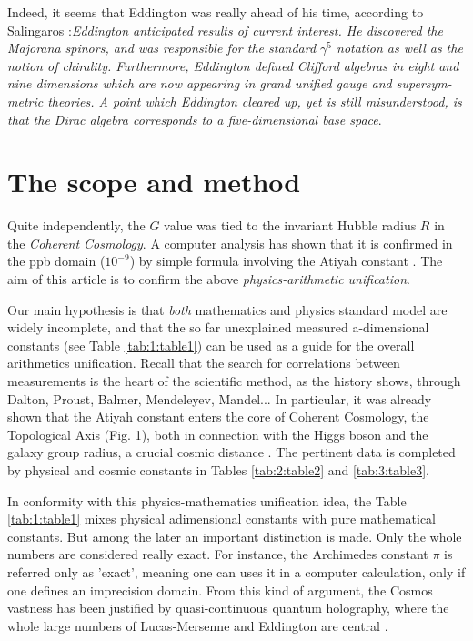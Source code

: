 \documentclass[a4paper,9pt]{article}
\begin{document}
    
Indeed, it seems that Eddington was really ahead of his time, according to Salingaros \cite {Salingaros} :\textit{Eddington anticipated results of current interest. He discovered the Majorana spinors, and was responsible for the standard $\gamma^5$ notation as well as the notion of chirality. Furthermore, Eddington defined Clifford algebras in eight and nine dimensions which are now appearing in grand unified gauge and supersym-metric theories. A point which Eddington cleared up, yet is still misunderstood, is that the Dirac algebra corresponds to a five-dimensional base space}.


       






\section{The scope and method}
   Quite independently, the $G$ value was tied to the invariant Hubble radius $R$ in the \textit {Coherent Cosmology}. A computer analysis has shown that it is confirmed in the ppb domain ($10^{-9}$) by simple formula involving the Atiyah constant \cite{Sanchez}. The aim of this article is to confirm the above \textit {physics-arithmetic unification}.
   
   Our main hypothesis is that \textit{both} mathematics and physics standard model are widely incomplete, and that the so far unexplained measured a-dimensional constants (see Table \ref{tab:1:table1}) can be used as a guide for the overall arithmetics unification. Recall that the search for correlations between measurements is the heart of the scientific method, as the history shows, through Dalton, Proust, Balmer, Mendeleyev, Mandel... In particular, it was already shown that the Atiyah constant enters the core of Coherent Cosmology, the Topological Axis (Fig. 1), both in connection with the Higgs boson and the galaxy group radius, a crucial cosmic distance \cite{Sanchez}. The pertinent data is completed by physical and cosmic constants in Tables \ref{tab:2:table2} and \ref{tab:3:table3}.
   
   
   In conformity with this physics-mathematics unification idea, the Table \ref{tab:1:table1} mixes physical adimensional constants \cite{Tanabashi} with pure mathematical constants. But among the later an important distinction is made. Only the whole numbers are considered really exact. For instance, the Archimedes constant $\pi$ is referred only as 'exact', meaning one can uses it in a computer calculation, only if one defines an imprecision domain. From this kind of argument, the Cosmos vastness has been justified by quasi-continuous quantum holography, where the whole large numbers of Lucas-Mersenne \cite{Bastin} and Eddington \cite{Eddington} are central \cite{Sanchez}.
      
\end{document}
